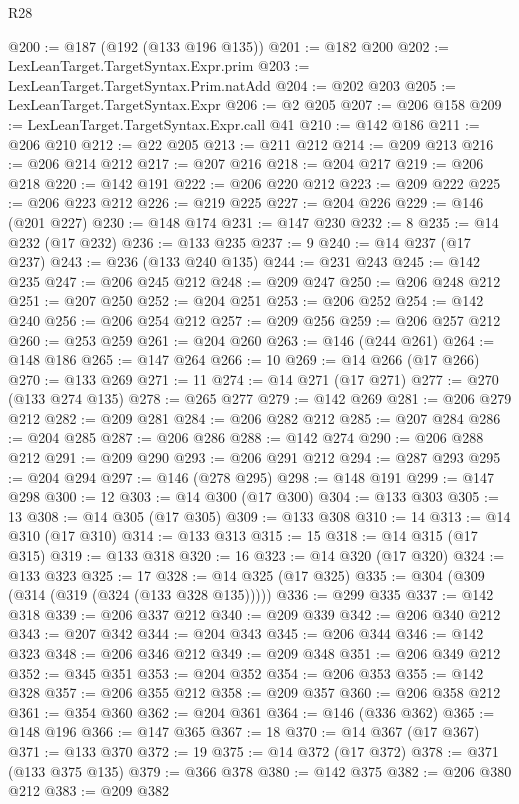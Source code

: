 \begin{lexlean}{R28}
\begin{coremodule}
@200 := @187 (@192 (@133 @196 @135))
@201 := @182 @200
@202 := LexLeanTarget.TargetSyntax.Expr.prim
@203 := LexLeanTarget.TargetSyntax.Prim.natAdd
@204 := @202 @203
@205 := LexLeanTarget.TargetSyntax.Expr
@206 := @2 @205
@207 := @206 @158
@209 := LexLeanTarget.TargetSyntax.Expr.call @41
@210 := @142 @186
@211 := @206 @210
@212 := @22 @205
@213 := @211 @212
@214 := @209 @213
@216 := @206 @214 @212
@217 := @207 @216
@218 := @204 @217
@219 := @206 @218
@220 := @142 @191
@222 := @206 @220 @212
@223 := @209 @222
@225 := @206 @223 @212
@226 := @219 @225
@227 := @204 @226
@229 := @146 (@201 @227)
@230 := @148 @174
@231 := @147 @230
@232 := 8
@235 := @14 @232 (@17 @232)
@236 := @133 @235
@237 := 9
@240 := @14 @237 (@17 @237)
@243 := @236 (@133 @240 @135)
@244 := @231 @243
@245 := @142 @235
@247 := @206 @245 @212
@248 := @209 @247
@250 := @206 @248 @212
@251 := @207 @250
@252 := @204 @251
@253 := @206 @252
@254 := @142 @240
@256 := @206 @254 @212
@257 := @209 @256
@259 := @206 @257 @212
@260 := @253 @259
@261 := @204 @260
@263 := @146 (@244 @261)
@264 := @148 @186
@265 := @147 @264
@266 := 10
@269 := @14 @266 (@17 @266)
@270 := @133 @269
@271 := 11
@274 := @14 @271 (@17 @271)
@277 := @270 (@133 @274 @135)
@278 := @265 @277
@279 := @142 @269
@281 := @206 @279 @212
@282 := @209 @281
@284 := @206 @282 @212
@285 := @207 @284
@286 := @204 @285
@287 := @206 @286
@288 := @142 @274
@290 := @206 @288 @212
@291 := @209 @290
@293 := @206 @291 @212
@294 := @287 @293
@295 := @204 @294
@297 := @146 (@278 @295)
@298 := @148 @191
@299 := @147 @298
@300 := 12
@303 := @14 @300 (@17 @300)
@304 := @133 @303
@305 := 13
@308 := @14 @305 (@17 @305)
@309 := @133 @308
@310 := 14
@313 := @14 @310 (@17 @310)
@314 := @133 @313
@315 := 15
@318 := @14 @315 (@17 @315)
@319 := @133 @318
@320 := 16
@323 := @14 @320 (@17 @320)
@324 := @133 @323
@325 := 17
@328 := @14 @325 (@17 @325)
@335 := @304 (@309 (@314 (@319 (@324 (@133 @328 @135)))))
@336 := @299 @335
@337 := @142 @318
@339 := @206 @337 @212
@340 := @209 @339
@342 := @206 @340 @212
@343 := @207 @342
@344 := @204 @343
@345 := @206 @344
@346 := @142 @323
@348 := @206 @346 @212
@349 := @209 @348
@351 := @206 @349 @212
@352 := @345 @351
@353 := @204 @352
@354 := @206 @353
@355 := @142 @328
@357 := @206 @355 @212
@358 := @209 @357
@360 := @206 @358 @212
@361 := @354 @360
@362 := @204 @361
@364 := @146 (@336 @362)
@365 := @148 @196
@366 := @147 @365
@367 := 18
@370 := @14 @367 (@17 @367)
@371 := @133 @370
@372 := 19
@375 := @14 @372 (@17 @372)
@378 := @371 (@133 @375 @135)
@379 := @366 @378
@380 := @142 @375
@382 := @206 @380 @212
@383 := @209 @382

\end{coremodule}
\end{lexlean}
